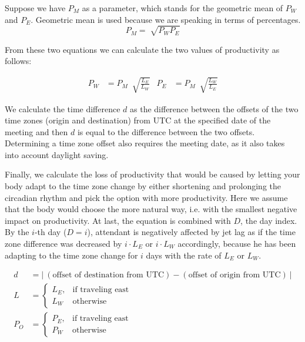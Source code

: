 Suppose we have $P_M$ as a parameter, which stands for the geometric mean of $P_W$ and $P_E$. Geometric mean is used because we are speaking in terms of percentages.
% 
% 
% 
$$P_M = \sqrt[]{P_W P_E}$$

From these two equations we can calculate the two values of productivity as follows:

\begin{align*}
P_W &= P_M \ \sqrt[]{\frac{L_E}{L_W}} & P_E &= P_M \ \sqrt[]{\frac{L_W}{L_E}}
\end{align*}

We calculate the time difference $d$ as the difference between the offsets of the two time zones (origin and destination) from UTC at the specified date of the meeting and then $d$ is equal to the difference between the two offsets. Determining a time zone offset also requires the meeting date, as it also takes into account daylight saving.

Finally, we calculate the loss of productivity that would be caused by letting your body adapt to the time zone change by either shortening and prolonging the circadian rhythm and pick the option with more productivity. Here we assume that the body would choose the more natural way, i.e. with the smallest negative impact on productivity. At last, the equation is combined with $D$, the day index. By the $i$-th day ($D = i$), attendant is negatively affected by jet lag as if the time zone difference was decreased by $i\cdot L_E$ or $i \cdot L_W$ accordingly, because he has been adapting to the time zone change for $i$ days with the rate of $L_E$ or $L_W$.

\begin{align*}
d &= \Big | \ {(\text{offset of destination from UTC}) - (\text{offset of origin from UTC})} \ \Big | \\
L &= 
\begin{cases}
    L_E ,& \text{if traveling east}\\
    L_W  & \text{otherwise}
\end{cases} \\
P_O &= 
\begin{cases}
    P_E ,& \text{if traveling east}\\
    P_W  & \text{otherwise}
\end{cases}
\end{align*}

